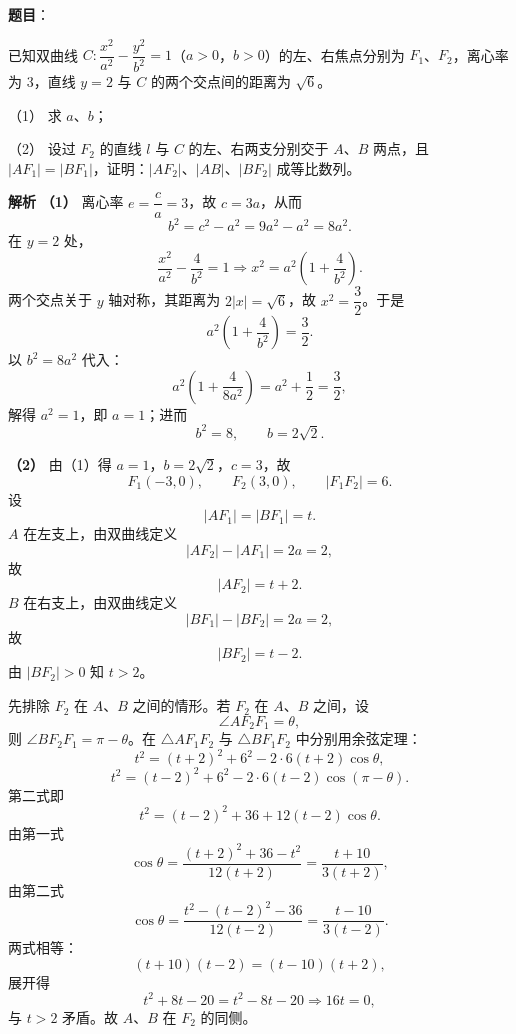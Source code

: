 \begin{answer}

\textbf{题目}：

已知双曲线 $C:\dfrac{x^2}{a^2}-\dfrac{y^2}{b^2}=1$（$a>0$，$b>0$）的左、右焦点分别为 $F_1$、$F_2$，离心率为 $3$，直线 $y=2$ 与 $C$ 的两个交点间的距离为 $\sqrt6$。

（1） 求 $a$、$b$；

（2） 设过 $F_2$ 的直线 $l$ 与 $C$ 的左、右两支分别交于 $A$、$B$ 两点，且 $|AF_1|=|BF_1|$，证明：$|AF_2|$、$|AB|$、$|BF_2|$ 成等比数列。

\textbf{解析}
\textbf{（1）} 离心率 $e=\dfrac ca=3$，故 $c=3a$，从而
\nopagebreak[4]
\[b^2=c^2-a^2=9a^2-a^2=8a^2.\]
在 $y=2$ 处，
\nopagebreak[4]
\[\frac{x^2}{a^2}-\frac4{b^2}=1
\Longrightarrow x^2=a^2\left(1+\frac4{b^2}\right).\]
两个交点关于 $y$ 轴对称，其距离为 $2|x|=\sqrt6$，故 $x^2=\dfrac32$。于是
\nopagebreak[4]
\[a^2\left(1+\frac4{b^2}\right)=\frac32.\]
以 $b^2=8a^2$ 代入：
\nopagebreak[4]
\[a^2\left(1+\frac4{8a^2}\right)
=a^2+\frac12=\frac32,\]
解得 $a^2=1$，即 $a=1$；进而
\nopagebreak[4]
\[b^2=8,\qquad b=2\sqrt2.\]

\textbf{（2）} 由（1）得 $a=1$，$b=2\sqrt2$，$c=3$，故
\nopagebreak[4]
\[F_1(-3,0),\qquad F_2(3,0),\qquad |F_1F_2|=6.\]
设
\nopagebreak[4]
\[|AF_1|=|BF_1|=t.\]
$A$ 在左支上，由双曲线定义
\nopagebreak[4]
\[|AF_2|-|AF_1|=2a=2,\]
故
\nopagebreak[4]
\[|AF_2|=t+2.\]
$B$ 在右支上，由双曲线定义
\nopagebreak[4]
\[|BF_1|-|BF_2|=2a=2,\]
故
\nopagebreak[4]
\[|BF_2|=t-2.\]
由 $|BF_2|>0$ 知 $t>2$。

先排除 $F_2$ 在 $A$、$B$ 之间的情形。若 $F_2$ 在 $A$、$B$ 之间，设
\nopagebreak[4]
\[\angle AF_2F_1=\theta,\]
则 $\angle BF_2F_1=\pi-\theta$。在 $\triangle AF_1F_2$ 与 $\triangle BF_1F_2$ 中分别用余弦定理：
\nopagebreak[4]
\[t^2=(t+2)^2+6^2-2\cdot6(t+2)\cos\theta,\]
\nopagebreak[4]
\[t^2=(t-2)^2+6^2-2\cdot6(t-2)\cos(\pi-\theta).\]
第二式即
\nopagebreak[4]
\[t^2=(t-2)^2+36+12(t-2)\cos\theta.\]
由第一式
\nopagebreak[4]
\[\cos\theta=\frac{(t+2)^2+36-t^2}{12(t+2)}
=\frac{t+10}{3(t+2)},\]
由第二式
\nopagebreak[4]
\[\cos\theta=\frac{t^2-(t-2)^2-36}{12(t-2)}
=\frac{t-10}{3(t-2)}.\]
两式相等：
\nopagebreak[4]
\[(t+10)(t-2)=(t-10)(t+2),\]
展开得
\nopagebreak[4]
\[t^2+8t-20=t^2-8t-20
\Longrightarrow 16t=0,\]
与 $t>2$ 矛盾。故 $A$、$B$ 在 $F_2$ 的同侧。


\end{answer}
